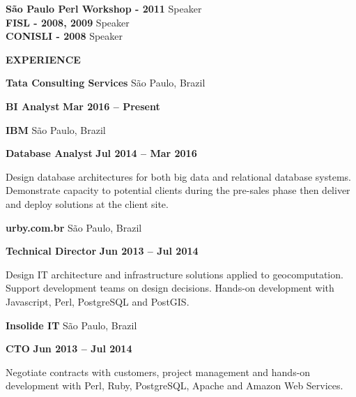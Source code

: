 \documentclass[a4paper,oneside]{memoir}
\begin{document}
\begin{multicols}{2}
\begin{flushright}
\normalsize

\textbf{São Paulo Perl Workshop - 2011}
\scriptsize
Speaker
\normalsize\\

\textbf{FISL - 2008, 2009}
\scriptsize
Speaker
\normalsize\\

\textbf{CONISLI - 2008}
\scriptsize
Speaker
\normalsize\\

\end{flushright}

\columnbreak

\begin{flushleft}

\Large\textbf{\color{RoyalBlue}\uppercase{Experience}}\normalsize

\textbf{\color{RoyalBlue}Tata Consulting Services} \footnotesize São Paulo, Brazil\normalsize

\textbf{BI Analyst}
\footnotesize\textbf{Mar 2016 -- Present}\normalsize

\textbf{\color{RoyalBlue}IBM} \footnotesize São Paulo, Brazil\normalsize

\textbf{Database Analyst}
\footnotesize\textbf{Jul 2014 -- Mar 2016}\normalsize

\scriptsize
Design database architectures for both big data and relational database systems.
Demonstrate capacity to potential clients during the pre-sales phase then
deliver and deploy solutions at the client site.

\normalsize

\textbf{\color{RoyalBlue}urby.com.br} \footnotesize São Paulo, Brazil\normalsize

\textbf{Technical Director}
\footnotesize\textbf{Jun 2013 -- Jul 2014}\normalsize

\scriptsize

Design IT architecture and infrastructure solutions applied to geocomputation.
Support development teams on design decisions. Hands-on development with
Javascript, Perl, PostgreSQL and PostGIS.

\normalsize

\textbf{\color{RoyalBlue}Insolide IT} \footnotesize São Paulo, Brazil\normalsize

\textbf{CTO}
\footnotesize\textbf{Jun 2013 -- Jul 2014}\normalsize

\scriptsize
Negotiate contracts with customers, project management and hands-on development
with Perl, Ruby, PostgreSQL, Apache and Amazon Web Services.


\end{flushleft}
\end{multicols}
\end{document}
